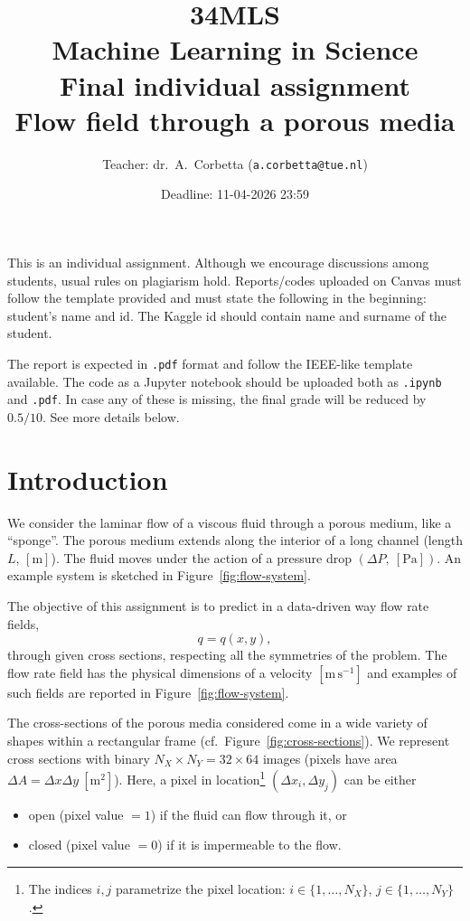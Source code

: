 \documentclass[11pt,a4paper]{article}
\title{34MLS\\Machine Learning in Science\\Final individual assignment\\Flow field through a porous media}
\author{Teacher: dr.\ A.\ Corbetta (\texttt{a.corbetta@tue.nl})}
\date{Deadline: 11-04-2026 23:59}
\begin{document}
\maketitle

This is an individual assignment. Although we encourage discussions among students, usual rules on plagiarism hold. Reports/codes uploaded on Canvas must follow the template provided and must state the following in the beginning: student's name and id. The Kaggle id should contain name and surname of the student.

The report is expected in \texttt{.pdf} format and follow the IEEE-like template available. The code as a Jupyter notebook should be uploaded both as \texttt{.ipynb} and \texttt{.pdf}. In case any of these is missing, the final grade will be reduced by \(0.5/10\). See more details below.

\section{Introduction}

We consider the laminar flow of a viscous fluid through a porous medium, like a ``sponge''. The porous medium extends along the interior of a long channel (length \(L\), \([\mathrm{m}]\)). The fluid moves under the action of a pressure drop \((\Delta P,\ [\mathrm{Pa}])\). An example system is sketched in Figure~\ref{fig:flow-system}.

The objective of this assignment is to predict in a data-driven way flow rate fields,
\[
q = q(x,y),
\]
through given cross sections, respecting all the symmetries of the problem. The flow rate field has the physical dimensions of a velocity \([\mathrm{m\,s^{-1}}]\) and examples of such fields are reported in Figure~\ref{fig:flow-system}.

The cross-sections of the porous media considered come in a wide variety of shapes within a rectangular frame (cf.\ Figure~\ref{fig:cross-sections}). We represent cross sections with binary \(N_X \times N_Y = 32 \times 64\) images (pixels have area \(\Delta A = \Delta x \Delta y\ [\mathrm{m}^2]\)). Here, a pixel in location\footnote{The indices \(i,j\) parametrize the pixel location: \(i \in \{1,\dots,N_X\}\), \(j \in \{1,\dots,N_Y\}\).} \((\Delta x_i,\Delta y_j)\) can be either
\begin{itemize}
    \item open (pixel value \(=1\)) if the fluid can flow through it, or
    \item closed (pixel value \(=0\)) if it is impermeable to the flow.
\end{itemize}
\end{document}
